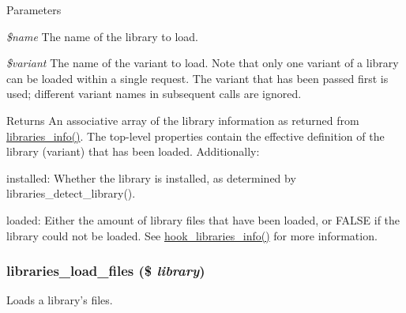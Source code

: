 \begin{DoxyParams}{Parameters}
\item[{\em \$name}]The name of the library to load. \item[{\em \$variant}]The name of the variant to load. Note that only one variant of a library can be loaded within a single request. The variant that has been passed first is used; different variant names in subsequent calls are ignored.\end{DoxyParams}
\begin{DoxyReturn}{Returns}
An associative array of the library information as returned from \hyperlink{libraries_8module_ae592b03bbea251cc7c008cd5ed10c861}{libraries\_\-info()}. The top-\/level properties contain the effective definition of the library (variant) that has been loaded. Additionally:
\begin{DoxyItemize}
\item installed: Whether the library is installed, as determined by libraries\_\-detect\_\-library().
\item loaded: Either the amount of library files that have been loaded, or FALSE if the library could not be loaded. See \hyperlink{libraries_8api_8php_abe57a1a01f1d2d134a9014258fe9e016}{hook\_\-libraries\_\-info()} for more information. 
\end{DoxyItemize}
\end{DoxyReturn}
\hypertarget{libraries_8module_a3e44d0658472eaa5363ecbee0dc61433}{
\subsubsection[{libraries\_\-load\_\-files}]{\setlength{\rightskip}{0pt plus 5cm}libraries\_\-load\_\-files (\$ {\em library})}}
\label{libraries_8module_a3e44d0658472eaa5363ecbee0dc61433}
Loads a library's files.


